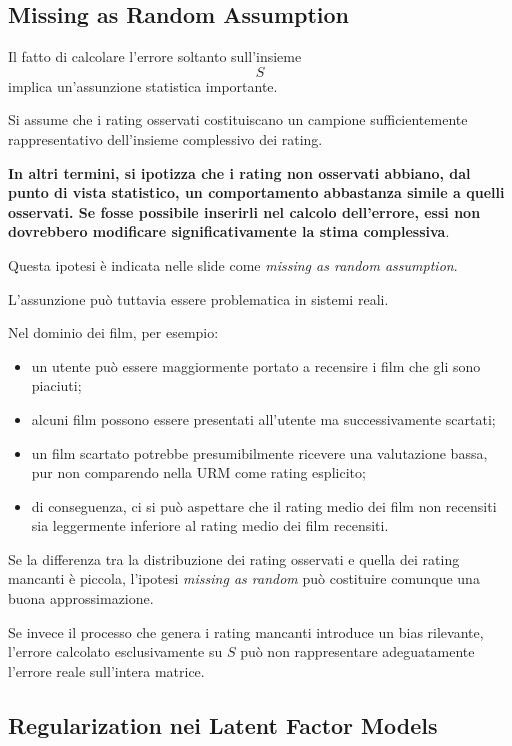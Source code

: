 \subsection{Missing as Random Assumption}

Il fatto di calcolare l'errore soltanto sull'insieme
\[
S
\]
implica un'assunzione statistica importante.

Si assume che i rating osservati costituiscano un campione sufficientemente rappresentativo dell'insieme complessivo dei rating.

\textbf{In altri termini, si ipotizza che i rating non osservati abbiano, dal punto di vista statistico, un comportamento abbastanza simile a quelli osservati. Se fosse possibile inserirli nel calcolo dell'errore, essi non dovrebbero modificare significativamente la stima complessiva}.

Questa ipotesi è indicata nelle slide come \emph{missing as random assumption}.

L'assunzione può tuttavia essere problematica in sistemi reali.

Nel dominio dei film, per esempio:
\begin{itemize}
    \item un utente può essere maggiormente portato a recensire i film che gli sono piaciuti;
    \item alcuni film possono essere presentati all'utente ma successivamente scartati;
    \item un film scartato potrebbe presumibilmente ricevere una valutazione bassa, pur non comparendo nella URM come rating esplicito;
    \item di conseguenza, ci si può aspettare che il rating medio dei film non recensiti sia leggermente inferiore al rating medio dei film recensiti.
\end{itemize}

Se la differenza tra la distribuzione dei rating osservati e quella dei rating mancanti è piccola, l'ipotesi \emph{missing as random} può costituire comunque una buona approssimazione.

Se invece il processo che genera i rating mancanti introduce un bias rilevante, l'errore calcolato esclusivamente su $S$ può non rappresentare adeguatamente l'errore reale sull'intera matrice.


\subsection{Regularization nei Latent Factor Models}

